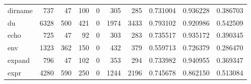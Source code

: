 \begin{tabular}{lrrrrrrrrr}
dirname   &                                                737 &                                                 47 &                                                100 &                                                  0 &                                                305 &                                                285 &                                           0.731004 &                               0.936228 &                             0.386703 \\
du        &                                               6328 &                                                500 &                                                421 &                                                  0 &                                               1974 &                                               3433 &                                           0.793102 &                               0.920986 &                             0.542509 \\
echo      &                                                725 &                                                 47 &                                                 92 &                                                  0 &                                                303 &                                                283 &                                           0.735517 &                               0.935172 &                             0.390345 \\
env       &                                               1323 &                                                362 &                                                150 &                                                  0 &                                                432 &                                                379 &                                           0.559713 &                               0.726379 &                             0.286470 \\
expand    &                                                796 &                                                 47 &                                                102 &                                                  0 &                                                353 &                                                294 &                                           0.733982 &                               0.940955 &                             0.369347 \\
expr      &                                               4280 &                                                590 &                                                250 &                                                  0 &                                               1244 &                                               2196 &                                           0.745678 &                               0.862150 &                             0.513084 \\

\end{tabular}
